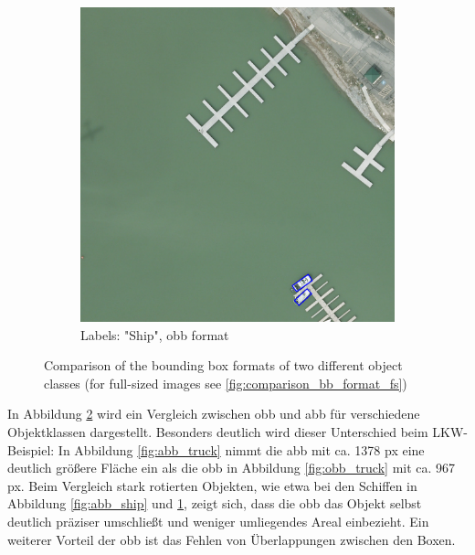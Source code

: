 \begin{figure}[h]
\begin{subfigure}[b]{0.45\textwidth}
        \includegraphics[trim={680pt 50pt 250pt 865pt},clip,width=\textwidth]{images/015Results/01abb_vs_obb/obb_ship.png}
        \caption{Labels: "Ship", obb format}
        \label{fig:obb_ship}
    \end{subfigure}  
    \caption[Comparison of the bounding box formats of two different object classes]{Comparison of the bounding box formats of two different object classes (for full-sized images see \ref{fig:comparison_bb_format_fs})}
    \label{fig:comparison_bb_format}
\end{figure}


In Abbildung \ref{fig:comparison_bb_format} wird ein Vergleich zwischen \acrshort{obb} und \acrshort{abb} für verschiedene Objektklassen dargestellt. Besonders deutlich wird dieser Unterschied beim LKW-Beispiel: In Abbildung \ref{fig:abb_truck} nimmt die \acrshort{abb} mit ca. 1378 px eine deutlich größere Fläche ein als die \acrshort{obb} in Abbildung \ref{fig:obb_truck} mit ca. 967 px. Beim Vergleich stark rotierten Objekten, wie etwa bei den Schiffen in Abbildung \ref{fig:abb_ship} und \ref{fig:obb_ship}, zeigt sich, dass die \acrshort{obb} das Objekt selbst deutlich präziser umschließt und weniger umliegendes Areal einbezieht. Ein weiterer Vorteil der \acrshort{obb} ist das Fehlen von Überlappungen zwischen den Boxen.

